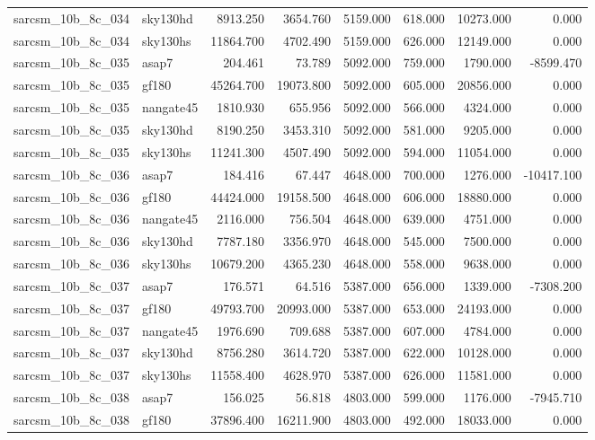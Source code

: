 \begin{tabular}{llrrrrrr}
sarcsm\_10b\_8c\_034 & sky130hd & 8913.250 & 3654.760 & 5159.000 & 618.000 & 10273.000 & 0.000 \\
sarcsm\_10b\_8c\_034 & sky130hs & 11864.700 & 4702.490 & 5159.000 & 626.000 & 12149.000 & 0.000 \\
sarcsm\_10b\_8c\_035 & asap7 & 204.461 & 73.789 & 5092.000 & 759.000 & 1790.000 & -8599.470 \\
sarcsm\_10b\_8c\_035 & gf180 & 45264.700 & 19073.800 & 5092.000 & 605.000 & 20856.000 & 0.000 \\
sarcsm\_10b\_8c\_035 & nangate45 & 1810.930 & 655.956 & 5092.000 & 566.000 & 4324.000 & 0.000 \\
sarcsm\_10b\_8c\_035 & sky130hd & 8190.250 & 3453.310 & 5092.000 & 581.000 & 9205.000 & 0.000 \\
sarcsm\_10b\_8c\_035 & sky130hs & 11241.300 & 4507.490 & 5092.000 & 594.000 & 11054.000 & 0.000 \\
sarcsm\_10b\_8c\_036 & asap7 & 184.416 & 67.447 & 4648.000 & 700.000 & 1276.000 & -10417.100 \\
sarcsm\_10b\_8c\_036 & gf180 & 44424.000 & 19158.500 & 4648.000 & 606.000 & 18880.000 & 0.000 \\
sarcsm\_10b\_8c\_036 & nangate45 & 2116.000 & 756.504 & 4648.000 & 639.000 & 4751.000 & 0.000 \\
sarcsm\_10b\_8c\_036 & sky130hd & 7787.180 & 3356.970 & 4648.000 & 545.000 & 7500.000 & 0.000 \\
sarcsm\_10b\_8c\_036 & sky130hs & 10679.200 & 4365.230 & 4648.000 & 558.000 & 9638.000 & 0.000 \\
sarcsm\_10b\_8c\_037 & asap7 & 176.571 & 64.516 & 5387.000 & 656.000 & 1339.000 & -7308.200 \\
sarcsm\_10b\_8c\_037 & gf180 & 49793.700 & 20993.000 & 5387.000 & 653.000 & 24193.000 & 0.000 \\
sarcsm\_10b\_8c\_037 & nangate45 & 1976.690 & 709.688 & 5387.000 & 607.000 & 4784.000 & 0.000 \\
sarcsm\_10b\_8c\_037 & sky130hd & 8756.280 & 3614.720 & 5387.000 & 622.000 & 10128.000 & 0.000 \\
sarcsm\_10b\_8c\_037 & sky130hs & 11558.400 & 4628.970 & 5387.000 & 626.000 & 11581.000 & 0.000 \\
sarcsm\_10b\_8c\_038 & asap7 & 156.025 & 56.818 & 4803.000 & 599.000 & 1176.000 & -7945.710 \\
sarcsm\_10b\_8c\_038 & gf180 & 37896.400 & 16211.900 & 4803.000 & 492.000 & 18033.000 & 0.000 \\

\end{tabular}
